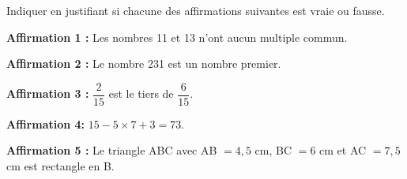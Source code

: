 
\medskip 

Indiquer en justifiant si chacune des affirmations suivantes est vraie ou fausse.

\medskip

\textbf{Affirmation 1 :} \og Les nombres 11 et 13 n'ont aucun multiple commun.\fg 

\smallskip

\textbf{Affirmation 2 :} \og Le nombre 231 est un nombre premier.\fg

\smallskip

\textbf{Affirmation 3 :} \og $\dfrac{2}{15}$ est le tiers de $\dfrac{6}{15}$.\fg 

\smallskip

\textbf{Affirmation 4:} \og $15 - 5 \times 7 + 3 = 73$. \fg 

\smallskip

\textbf{Affirmation 5 :} \og Le triangle ABC avec AB $= 4,5$ cm, BC $= 6$ cm et AC $= 7,5$ cm est rectangle en B. \fg 

\vspace{0,5cm}

